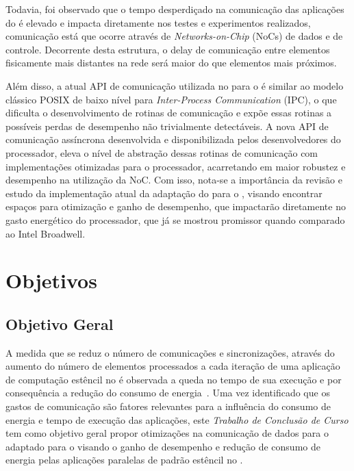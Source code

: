 Todavia, foi observado que o tempo desperdiçado na comunicação das aplicações do \mppa é elevado e impacta diretamente nos testes e experimentos realizados, comunicação está que ocorre através de \textit{Networks-on-Chip} (NoCs) de dados e de controle. Decorrente desta estrutura, o delay de comunicação entre elementos fisicamente mais distantes na rede será maior do que elementos mais próximos.

Além disso, a atual API de comunicação utilizada no \pskel para o \mppa é similar ao modelo clássico POSIX de baixo nível para \textit{Inter-Process Communication} (IPC), o que dificulta o desenvolvimento de rotinas de comunicação e expõe essas rotinas a possíveis perdas de desempenho não trivialmente detectáveis. A nova API de comunicação assíncrona desenvolvida e disponibilizada pelos desenvolvedores do processador, eleva o nível de abstração dessas rotinas de comunicação com implementações otimizadas para o processador, acarretando em maior robustez e desempenho na utilização da NoC. Com isso, nota-se a importância da revisão e estudo da implementação atual da adaptação do \fw \pskel para o \mppa, visando encontrar espaços para otimização e ganho de desempenho, que impactarão diretamente no gasto energético do processador, que já se mostrou promissor quando comparado ao Intel Broadwell. 

\section{Objetivos}
\label{sec:objetivos}

\subsection{Objetivo Geral}
\label{subsec:objetivos-gerais}

A medida que se reduz o número de comunicações e sincronizações, através do aumento do número de elementos processados a cada iteração de uma aplicação de computação estêncil no \mppa é observada a queda no tempo de sua execução e por consequência a redução do consumo de energia~\cite{wscad2017}. Uma vez identificado que os gastos de comunicação são fatores relevantes para a influência do consumo de energia e tempo de execução das aplicações, este \textit{Trabalho de Conclusão de Curso} tem como objetivo geral propor otimizações na comunicação de dados para o \fw \pskel adaptado para o \mppa visando o ganho de desempenho e redução de consumo de energia pelas aplicações paralelas de padrão estêncil no \mppa.


